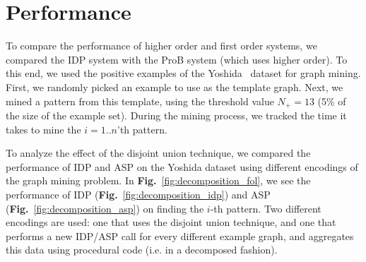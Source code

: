 \section{Performance}\label{sec:performance}
To compare the performance of higher order and first order systems, we compared the IDP system with the ProB system (which uses higher order).
To this end, we used the positive examples of the Yoshida~\citep{yoshida_dataset} dataset for graph mining.
First, we randomly picked an example to use as the template graph.
Next, we mined a pattern from this template, using the threshold value $N_{+} = 13$ (5\% of the size of the example set).
During the mining process, we tracked the time it takes to mine the $i=1..n$'th pattern.


To analyze the effect of the disjoint union technique, we compared the performance of IDP and ASP on the Yoshida dataset using different encodings of the graph mining problem.
In \textbf{Fig.}~\ref{fig:decomposition_fol}, we see the performance of IDP (\textbf{Fig.}~\ref{fig:decomposition_idp}) and ASP (\textbf{Fig.}~\ref{fig:decomposition_asp}) on finding the $i$-th pattern.
Two different encodings are used: one that uses the disjoint union technique, and one that performs a new IDP/ASP call for every different example graph, and aggregates this data using procedural code (i.e. in a decomposed fashion).

